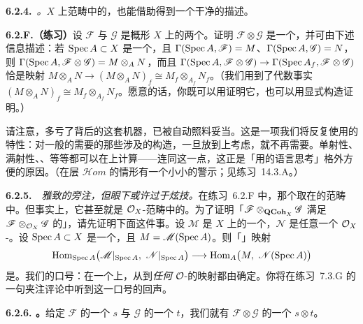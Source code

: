 \textbf{6.2.4.}\ \emph{\trTensorProduct。}\quad $X$ 上\trQCSheaf{}范畴中的\trTensorProduct，也能借助\trAffine\trOpenSet{}得到一个干净的描述。

\textbf{6.2.F.（练习）}\quad 设 $\mathscr{F}$ 与 $\mathscr{G}$ 是概形 $X$ 上的两个\trQCSheaf。证明 $\mathscr{F}\otimes\mathscr{G}$ 是一个\trQCSheaf，并可由下述信息描述：若 $\operatorname{Spec} A\subset X$ 是一个\trAffine\trOpenSubset，且 $\Gamma(\operatorname{Spec} A,\mathscr{F})=M$、$\Gamma(\operatorname{Spec} A,\mathscr{G})=N$，则 $\Gamma(\operatorname{Spec} A,\mathscr{F}\otimes\mathscr{G})=M\otimes_A N$，而且\trRestrictionMap{} $\Gamma(\operatorname{Spec} A,\mathscr{F}\otimes\mathscr{G})\to\Gamma(\operatorname{Spec} A_f,\mathscr{F}\otimes\mathscr{G})$ 恰是\trLocalization{}映射 $M\otimes_A N\to(M\otimes_A N)_f\cong M_f\otimes_{A_f}N_f$。（我们用到了代数事实 $(M\otimes_A N)_f\cong M_f\otimes_{A_f}N_f$。愿意的话，你既可以用\trUniversalProperty{}证明它，也可以用显式构造证明。）

请注意，多亏了\trDistinguishedAffineBase{}背后的这套机器，\trSheafification{}已被自动照料妥当。这是一项我们将反复使用的特性：对一般的\trSheaf{}需要\trSheafification{}的那些涉及\trQCSheaf{}的构造，一旦放到\trDistinguishedAffineBase{}上考虑，就不再需要\trSheafification。单射性、满射性、\trKernel、\trTensorProduct{}等等都可以在\trAffine\trOpenSet{}上计算——连同这一点，这正是「用\trAffine\trOpenSet{}的语言思考\trQCSheaf」格外方便的原因。（在层 $\mathscr{H}om$ 的情形有一个小小的警示；见练习~14.3.A。）

\textbf{6.2.5.}\ \extrahard\ \emph{雅致的旁注，但眼下或许过于炫技。}\quad 在练习~6.2.F 中，那个\trTensorProduct{}取在\trQCSheaf{}的范畴中。但事实上，它甚至就是 $\mathcal{O}_X$-\trModule{}范畴中的\trTensorProduct。为了证明「$\mathscr{F}\otimes_{\mathbf{QCoh}_X}\mathscr{G}$ 满足 $\mathscr{F}\otimes_{\mathcal{O}_X}\mathscr{G}$ 的\trUniversalProperty{}」，请先证明下面这件事。设 $\mathscr{M}$ 是 $X$ 上的一个\trQCSheaf，$\mathscr{N}$ 是任意一个 $\mathcal{O}_X$-\trModule。设 $\operatorname{Spec} A\subset X$ 是一个\trAffine\trOpenSubset，且 $M=\mathscr{M}(\operatorname{Spec} A)$。则「\trGlobalSections」映射
\[
\Hom_{\Spec A}\bigl(\mathscr{M}|_{\Spec A},\ \mathscr{N}|_{\Spec A}\bigr)\longrightarrow\Hom_A\bigl(M,\ \mathscr{N}(\Spec A)\bigr)
\]
是\trIsomorphism。我们的口号：在一个\trAffineScheme{}上，从\trQCSheaf{}到\emph{任何} $\mathcal{O}$-\trModule{}的映射都由\trGlobalSections{}确定。你将在练习~7.3.G 的一句夹注评论中听到这一口号的回声。

\textbf{6.2.6. \trhDefinition{}。}\quad 给定 $\mathscr{F}$ 的一个\trSection{} $s$ 与 $\mathscr{G}$ 的一个\trSection{} $t$，我们就有 $\mathscr{F}\otimes\mathscr{G}$ 的一个\trSection{} $s\otimes t$。

